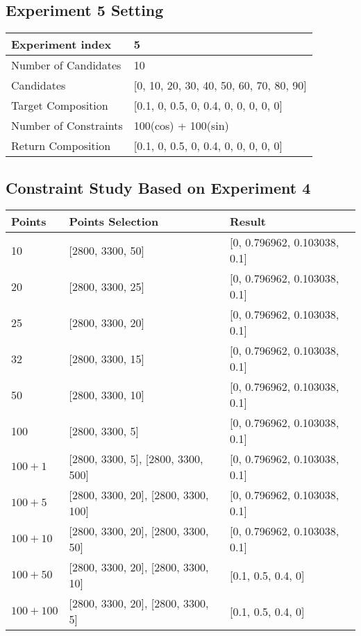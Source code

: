 \subsection{Experiment 5 Setting}
\begin{table}
\begin{tabular}{l | p{7cm} | }
\hline
Experiment index & 5  \\
\hline
Number of Candidates & 10   \\
\hline
Candidates & [0, 10, 20, 30, 40, 50, 60, 70, 80, 90]  \\
\hline
Target Composition & [0.1, 0, 0.5, 0, 0.4, 0, 0, 0, 0, 0] \\
\hline
Number of Constraints & 100(cos) + 100(sin) \\
\hline
Return Composition & [0.1, 0, 0.5, 0, 0.4, 0, 0, 0, 0, 0] \\
\hline
\end{tabular} 
\end{table}



\subsection{Constraint Study Based on Experiment 4}
\begin{table} \small
\begin{tabular}{l | p{3cm} | l}
	\hline
	Points & Points Selection & Result \\ \hline
	10 & [2800, 3300, 50] & [0, 0.796962, 0.103038, 0.1] \\ \hline
	20 & [2800, 3300, 25] & [0, 0.796962, 0.103038, 0.1] \\ \hline
	25 & [2800, 3300, 20] & [0, 0.796962, 0.103038, 0.1] \\ \hline
	32 & [2800, 3300, 15] & [0, 0.796962, 0.103038, 0.1] \\ \hline
	50 & [2800, 3300, 10] & [0, 0.796962, 0.103038, 0.1] \\ \hline
	100 & [2800, 3300, 5] & [0, 0.796962, 0.103038, 0.1] \\ \hline
	$100 + 1$ & [2800, 3300, 5], [2800, 3300, 500] & [0, 0.796962, 0.103038, 0.1] \\ \hline
	$100 + 5$ & [2800, 3300, 20], [2800, 3300, 100] & [0, 0.796962, 0.103038, 0.1] \\ \hline
	$100 + 10$ & [2800, 3300, 20], [2800, 3300, 50] & [0, 0.796962, 0.103038, 0.1] \\ \hline
	$100 + 50$ & [2800, 3300, 20], [2800, 3300, 10] & [0.1, 0.5, 0.4, 0] \\ \hline
	$100 + 100$ & [2800, 3300, 20], [2800, 3300, 5] & [0.1, 0.5, 0.4, 0] \\ 
	\hline
\end{tabular} 
\end{table}



